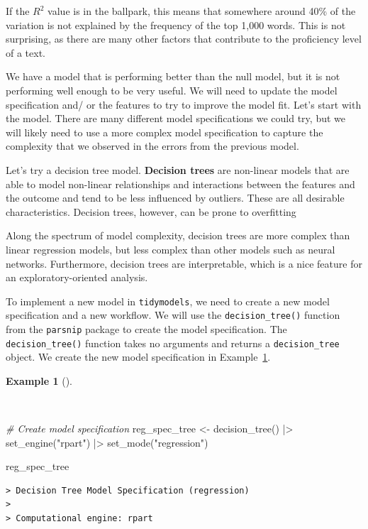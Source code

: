 \documentclass[
  letterpaper,
  DIV=11,
  numbers=noendperiod]{scrreprt}
\newenvironment{Shaded}{\begin{snugshade}}{\end{snugshade}}
\newcommand{\CommentTok}[1]{\textcolor[rgb]{0.00,0.00,0.00}{\textit{#1}}}
\newcommand{\FunctionTok}[1]{\textcolor[rgb]{0.00,0.00,0.00}{#1}}
\newcommand{\NormalTok}[1]{\textcolor[rgb]{0.00,0.00,0.00}{#1}}
\newcommand{\OtherTok}[1]{\textcolor[rgb]{0.00,0.00,0.00}{#1}}
\newcommand{\SpecialCharTok}[1]{\textcolor[rgb]{0.00,0.00,0.00}{#1}}
\newcommand{\StringTok}[1]{\textcolor[rgb]{0.00,0.00,0.00}{#1}}
\theoremstyle{definition}
\newtheorem{example}{Example}[chapter]
\theoremstyle{remark}
\begin{document}
If the \(R^2\) value is in the ballpark, this means that somewhere
around 40\% of the variation is not explained by the frequency of the
top 1,000 words. This is not surprising, as there are many other factors
that contribute to the proficiency level of a text.

We have a model that is performing better than the null model, but it is
not performing well enough to be very useful. We will need to update the
model specification and/ or the features to try to improve the model
fit. Let's start with the model. There are many different model
specifications we could try, but we will likely need to use a more
complex model specification to capture the complexity that we observed
in the errors from the previous model.

Let's try a decision tree model. \textbf{Decision trees} are non-linear
models that are able to model non-linear relationships and interactions
between the features and the outcome and tend to be less influenced by
outliers. These are all desirable characteristics. Decision trees,
however, can be prone to overfitting

Along the spectrum of model complexity, decision trees are more complex
than linear regression models, but less complex than other models such
as neural networks. Furthermore, decision trees are interpretable, which
is a nice feature for an exploratory-oriented analysis.

To implement a new model in \texttt{tidymodels}, we need to create a new
model specification and a new workflow. We will use the
\texttt{decision\_tree()} function from the \texttt{parsnip} package to
create the model specification. The \texttt{decision\_tree()} function
takes no arguments and returns a \texttt{decision\_tree} object. We
create the new model specification in
Example~\ref{exm-pda-reg-model-spec-decision-tree}.

\begin{example}[]\protect\hypertarget{exm-pda-reg-model-spec-decision-tree}{}\label{exm-pda-reg-model-spec-decision-tree}

~

\begin{Shaded}
\begin{Highlighting}[]
\CommentTok{\# Create model specification}
\NormalTok{reg\_spec\_tree }\OtherTok{\textless{}{-}}
  \FunctionTok{decision\_tree}\NormalTok{() }\SpecialCharTok{|\textgreater{}}
  \FunctionTok{set\_engine}\NormalTok{(}\StringTok{"rpart"}\NormalTok{) }\SpecialCharTok{|\textgreater{}}
  \FunctionTok{set\_mode}\NormalTok{(}\StringTok{"regression"}\NormalTok{)}

\NormalTok{reg\_spec\_tree}
\end{Highlighting}
\end{Shaded}

\begin{verbatim}
> Decision Tree Model Specification (regression)
> 
> Computational engine: rpart
\end{verbatim}

\end{example}
\end{document}
